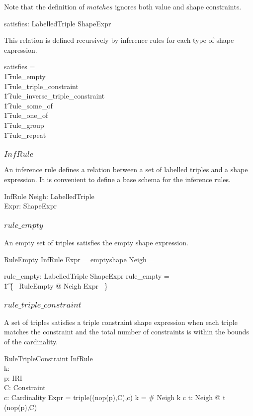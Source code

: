 \documentclass{article}
\begin{document}
Note that the definition of $matches$ ignores both value and shape constraints.

\begin{axdef}
	satisfies: \finset LabelledTriple \rel ShapeExpr
\end{axdef}

This relation is defined recursively by inference rules for each type of shape expression.
\begin{zed}
	satisfies = \\
\t1		rule\_empty \cup \\
\t1		rule\_triple\_constraint \cup \\
\t1		rule\_inverse\_triple\_constraint \cup \\
\t1		rule\_some\_of \cup \\
\t1		rule\_one\_of \cup \\
\t1		rule\_group \cup \\
\t1		rule\_repeat
\end{zed}

\subsubsection{$InfRule$}
An inference rule defines a relation between a set of labelled triples and a shape expression.
It is convenient to define a base schema for the inference rules.
\begin{schema}{InfRule}
	Neigh: \finset LabelledTriple \\
	Expr: ShapeExpr
\end{schema}

\subsubsection{$rule\_empty$}
An empty set of triples satisfies the empty shape expression.
\begin{schema}{RuleEmpty}
	InfRule
\where
	Expr = emptyshape
\also
	Neigh = \emptyset
\end{schema}

\begin{axdef}
	rule\_empty: \finset LabelledTriple \rel ShapeExpr
\where
	rule\_empty = \\ 
\t1		\{~ RuleEmpty @ Neigh \mapsto Expr ~\}
\end{axdef}

\subsubsection{$rule\_triple\_constraint$}
A set of triples satisfies a triple constraint shape expression when each triple matches the constraint
and the total number of constraints is within the bounds of the cardinality.
\begin{schema}{RuleTripleConstraint}
	InfRule \\
	k: \nat \\
	p: IRI \\
	C: Constraint \\
	c: Cardinality
\where
	Expr = triple((nop(p),C),c)
\also
	k = \# Neigh
\also
	k  c
\also
	\forall t: Neigh @ t  (nop(p),C)
\end{schema}
\end{document}
